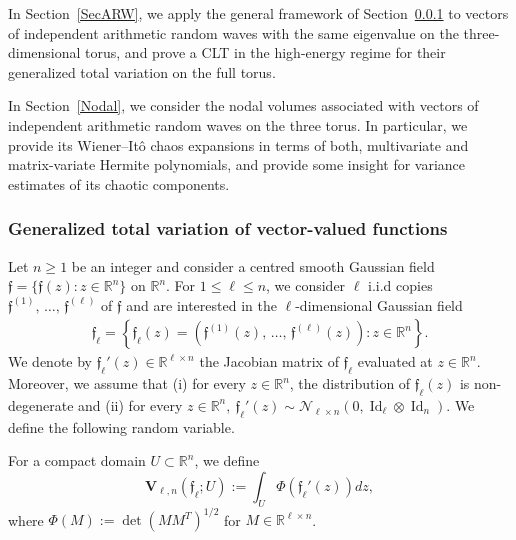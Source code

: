 \documentclass[AHL,Unicode,longabstracts,published]{cedram}
\DeclareMathOperator{\Id}{Id}
\newcommand{\scN}{\mathscr{N}}
\newcommand{\bfv}{\mathbf{V}}
\newcommand{\frkf}{\mathfrak{f}}
\newcommand{\R}{\mathbb{R}}
\begin{document}
In Section~\ref{SecARW}, we apply the general framework of Section~\ref{TotalVar} to vectors of independent arithmetic random waves with the same eigenvalue on the three-dimensional torus, and prove a CLT in the high-energy regime for their generalized total variation on the full torus.

In Section~\ref{Nodal}, we consider the nodal volumes associated with vectors of independent arithmetic random waves on the three torus. In particular, we provide its Wiener--Itô chaos expansions in terms of both, multivariate and matrix-variate Hermite polynomials, and provide some insight for variance estimates of its chaotic components.

\subsubsection{Generalized total variation of vector-valued functions}\label{TotalVar}

Let $n\geq 1$ be an integer and consider a centred smooth Gaussian field $\frkf=\{\frkf(z): z\in \R^n\}$ on $\R^n$. For $1\leq \ell \leq n$, we consider $\ell$ i.i.d copies $\frkf^{(1)},\,\ldots, \,\frkf^{(\ell)}$ of $\frkf$ and are interested in the $\ell$-dimensional Gaussian field
\begin{gather*}
\frkf_{\ell}=\left\{\frkf_{\ell}(z)=\left(\frkf^{(1)}(z),\,\ldots,\,\frkf^{(\ell)}(z)\right): z \in \R^n\right\}.
\end{gather*}
We denote by $\frkf_{\ell}'(z) \in \R^{\ell \times n}$ the Jacobian matrix of $\frkf_{\ell}$ evaluated at $z \in \R^n$. Moreover, we assume that (i) for every $z\in \R^n$, the distribution of $\frkf_{\ell}(z)$ is non-degenerate and (ii) for every $z\in \R^n, \ \frkf_{\ell}'(z) \sim \scN_{\ell \times n}(0,\Id_{\ell}\otimes \Id_n)$. We define the following random variable.

\begin{defi}
For a compact domain $U \subset \R^n$, we define
\begin{equation}\label{TOT}
\bfv_{\ell,n}(\frkf_{\ell};U) := \int_{U} \Phi\left(\frkf_{\ell}'(z)\right) dz,
\end{equation}
where $\Phi(M):=\det(MM^T)^{1/2}$ for $M \in \R^{\ell \times n}$.
\end{defi}
\end{document}
